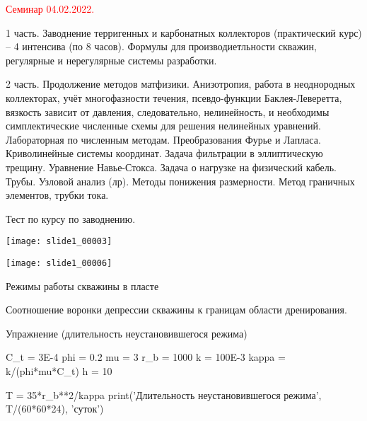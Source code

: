 \documentclass[main.tex]{subfiles}
\begin{document}
\textcolor{red}{Семинар 04.02.2022.}

1 часть. Заводнение терригенных и карбонатных коллекторов (практический курс) -- 4 интенсива (по 8 часов). Формулы для производиетльности скважин, регулярные и нерегулярные системы разработки.

2 часть. Продолжение методов матфизики. Анизотропия, работа в неоднородных коллекторах, учёт многофазности течения, псевдо-функции Баклея-Леверетта, вязкость зависит от давления, следовательно, нелинейность, и необходимы симплектические численные схемы для решения нелинейных уравнений. Лабораторная по численным методам. Преобразования Фурье и Лапласа. Криволинейные системы координат. Задача фильтрации в эллиптическую трещину. Уравнение Навье-Стокса. Задача о нагрузке на физический кабель. Трубы. Узловой анализ (лр). Методы понижения размерности. Метод граничных элементов, трубки тока.

Тест по курсу по заводнению.

\texttt{[image: slide1\_00003]}

\texttt{[image: slide1\_00006]}

Режимы работы скважины в пласте

Соотношение воронки депрессии скважины к границам области дренирования.

Упражнение (длительность неустановившегося режима)

\begin{python}
C_t = 3E-4
phi = 0.2
mu = 3
r_b = 1000
k = 100E-3
kappa = k/(phi*mu*C_t)
h = 10

T = 35*r_b**2/kappa
print('Длительность неустановившегося режима', T/(60*60*24), 'суток')
\end{python}
\end{document}
